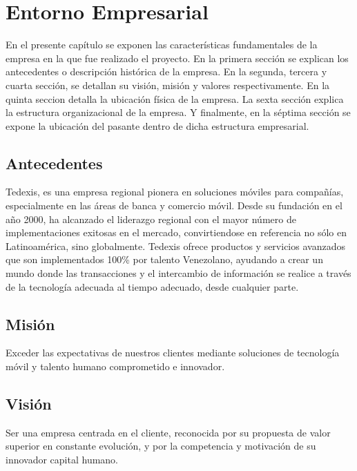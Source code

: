 \chapter{Entorno Empresarial}

\vspace{5 mm}


	En el presente capítulo se exponen las características fundamentales de la empresa en la que fue realizado el proyecto. En la primera sección se explican los antecedentes o descripción histórica de la empresa. En la segunda, tercera y cuarta sección, se detallan su visión, misión y valores respectivamente. En la quinta seccion detalla la ubicación física de la empresa. La sexta sección explica la estructura organizacional de la empresa. Y finalmente, en la séptima sección se expone la ubicación del pasante dentro de dicha estructura empresarial.\cite{TDX}

\section{Antecedentes} \label{sect:Antecedentes}

	Tedexis, es una empresa regional pionera en soluciones móviles para compañías, especialmente en las áreas de banca y comercio móvil. Desde su fundación en el año 2000, ha alcanzado el liderazgo regional con el mayor número de implementaciones exitosas en el mercado,
convirtiendose en referencia no sólo en Latinoamérica, sino globalmente. 
\newline	
\newline
\indent Tedexis ofrece productos y servicios avanzados que son implementados 100\% por talento Venezolano, ayudando a crear un mundo donde las transacciones y el intercambio de información se realice a través de la tecnología adecuada al tiempo adecuado, desde cualquier parte.

\section{Misión} \label{sect:Mision}
	Exceder las expectativas de nuestros clientes mediante soluciones de tecnología móvil y talento humano comprometido e innovador.\cite{TDX}

\section{Visión} \label{sect:Vision}
	Ser una empresa centrada en el cliente, reconocida por su propuesta de valor superior en constante evolución, y por la competencia y motivación de su innovador capital humano.\cite{TDX}

